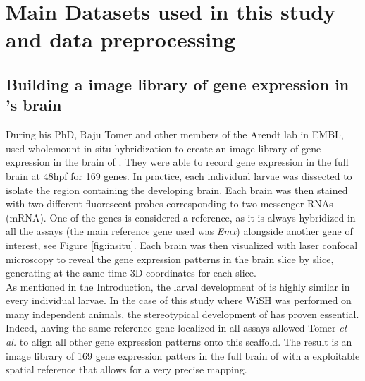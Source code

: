 \chapter{Main Datasets used in this study and data preprocessing}\label{ch:singlecell}
\section{Building a image library of gene expression in \platy{}'s brain}
     During his PhD, Raju Tomer and other members of the Arendt lab in EMBL, used wholemount in-situ hybridization to create an image library of gene expression in the brain of \platy{}. They were able to record gene expression in the full brain at 48hpf for 169 genes. In practice, each individual larvae was dissected to isolate the region containing the developing brain. Each brain was then stained with two different fluorescent probes corresponding to two messenger RNAs (mRNA). One of the genes is considered a reference, as it is always hybridized in all the assays (the main reference gene used was \emph{Emx}) alongside another gene of interest, see Figure \ref{fig:insitu}. Each brain was then visualized with laser confocal microscopy to reveal the gene expression patterns in the brain slice by slice, generating at the same time 3D coordinates for each slice.\\
     
     As mentioned in the Introduction, the larval development of \platy{} is highly similar in every individual larvae. In the case of this study where WiSH was performed on many independent animals, the stereotypical development of \platy{} has proven essential. Indeed, having the same reference gene localized in all assays allowed Tomer \emph{et al.} to align all other gene expression patterns onto this scaffold. The result is an image library of 169 gene expression patters in the full brain of \platy{} with a exploitable spatial reference that allows for a very precise mapping.\\
    
